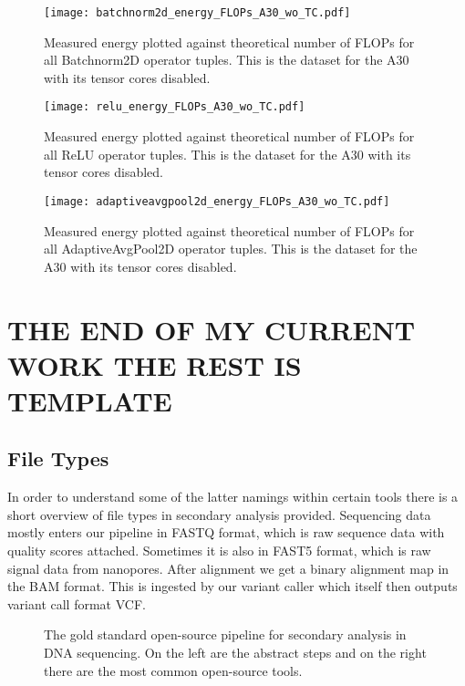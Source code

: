 \documentclass[conference]{IEEEtran}
\begin{document}
\begin{figure}
    \texttt{[image: batchnorm2d\_energy\_FLOPs\_A30\_wo\_TC.pdf]}
    \caption{Measured energy plotted against theoretical number of FLOPs for all Batchnorm2D operator tuples. This is the dataset for the A30 with its tensor cores disabled.}
    \label{fig:batchnorm2da30notc}
    \texttt{[image: relu\_energy\_FLOPs\_A30\_wo\_TC.pdf]}
    \caption{Measured energy plotted against theoretical number of FLOPs for all ReLU operator tuples. This is the dataset for the A30 with its tensor cores disabled.}
    \label{fig:relua30notc}
\end{figure}


\begin{figure}
    \texttt{[image: adaptiveavgpool2d\_energy\_FLOPs\_A30\_wo\_TC.pdf]}
    \caption{Measured energy plotted against theoretical number of FLOPs for all AdaptiveAvgPool2D operator tuples. This is the dataset for the A30 with its tensor cores disabled.}
    \label{fig:adavgpool2da30notc}
\end{figure}




\section{THE END OF MY CURRENT WORK THE REST IS TEMPLATE}

\subsection{File Types}
In order to understand some of the latter namings within certain tools there is a short overview of file types in secondary analysis provided. Sequencing data mostly enters our pipeline in FASTQ format, which is raw sequence data with quality scores attached. Sometimes it is also in FAST5 format, which is raw signal data from nanopores. After alignment we get a binary alignment map in the BAM format. This is ingested by our variant caller which itself then outputs variant call format VCF. \\




    
\begin{figure}
    \centering
    \caption{The gold standard open-source pipeline for secondary analysis in DNA sequencing. On the left are the abstract steps and on the right there are the most common open-source tools.}
    \label{fig:enter-label}
\end{figure}
\end{document}
